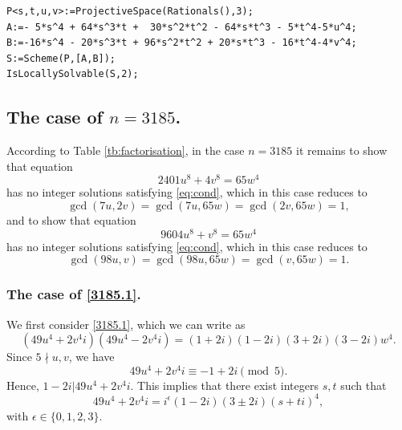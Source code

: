 \documentclass[a4paper,12pt,english,reqno]{amsart}
\begin{document}

\begin{lstlisting}
P<s,t,u,v>:=ProjectiveSpace(Rationals(),3);
A:=- 5*s^4 + 64*s^3*t +  30*s^2*t^2 - 64*s*t^3 - 5*t^4-5*u^4;
B:=-16*s^4 - 20*s^3*t + 96*s^2*t^2 + 20*s*t^3 - 16*t^4-4*v^4;
S:=Scheme(P,[A,B]);
IsLocallySolvable(S,2);
\end{lstlisting}

\subsection{The case of $n=3185$.}

According to Table \ref{tb:factorisation}, in the case $n=3185$ it remains to
show that equation
\begin{equation}\label{3185.1}
2401 u^8 + 4 v^8= 65  w^4 
\end{equation}
has no integer solutions satisfying \eqref{eq:cond}, which in this case reduces to \[\gcd(7u,2v)=\gcd(7u,65w)=\gcd(2v,65w)=1,\]  and to show that equation
\begin{equation}\label{3185.2}
9604 u^8 + v^8=65  w^4
\end{equation}
has no integer solutions satisfying \eqref{eq:cond}, which in this case reduces to \[\gcd(98u,v)=\gcd(98u,65w)=\gcd(v,65w)=1.\]


\subsubsection{The case of \eqref{3185.1}.}
We first consider \eqref{3185.1}, which we can write as
\begin{equation} (49u^4+2v^4i)(49u^4-2v^4i)=(1+2i)(1-2i)(3+2i)(3-2i)w^4.
\end{equation}
Since $5\nmid u,v$, we have
\[49u^4+2v^4i\equiv -1+2i\pmod{5}.\]
Hence, $1-2i|49u^4+2v^4i$. This implies that there exist integers $s,t$ such that 
\[49u^4+2v^4i=i^{\epsilon}(1-2i)(3\pm 2i)(s+ti)^4,\]
with $\epsilon \in \{0,1,2,3\}$.
\end{document}
